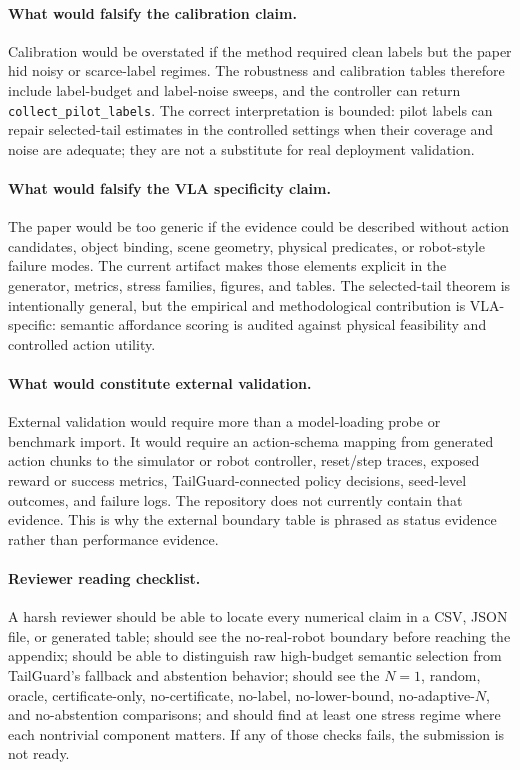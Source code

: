 \documentclass{article}
\begin{document}
\paragraph{What would falsify the calibration claim.}
Calibration would be overstated if the method required clean labels but the paper hid noisy or scarce-label regimes. The robustness and calibration tables therefore include label-budget and label-noise sweeps, and the controller can return \texttt{collect\_pilot\_labels}. The correct interpretation is bounded: pilot labels can repair selected-tail estimates in the controlled settings when their coverage and noise are adequate; they are not a substitute for real deployment validation.

\paragraph{What would falsify the VLA specificity claim.}
The paper would be too generic if the evidence could be described without action candidates, object binding, scene geometry, physical predicates, or robot-style failure modes. The current artifact makes those elements explicit in the generator, metrics, stress families, figures, and tables. The selected-tail theorem is intentionally general, but the empirical and methodological contribution is VLA-specific: semantic affordance scoring is audited against physical feasibility and controlled action utility.

\paragraph{What would constitute external validation.}
External validation would require more than a model-loading probe or benchmark import. It would require an action-schema mapping from generated action chunks to the simulator or robot controller, reset/step traces, exposed reward or success metrics, TailGuard-connected policy decisions, seed-level outcomes, and failure logs. The repository does not currently contain that evidence. This is why the external boundary table is phrased as status evidence rather than performance evidence.

\paragraph{Reviewer reading checklist.}
A harsh reviewer should be able to locate every numerical claim in a CSV, JSON file, or generated table; should see the no-real-robot boundary before reaching the appendix; should be able to distinguish raw high-budget semantic selection from TailGuard's fallback and abstention behavior; should see the $N=1$, random, oracle, certificate-only, no-certificate, no-label, no-lower-bound, no-adaptive-$N$, and no-abstention comparisons; and should find at least one stress regime where each nontrivial component matters. If any of those checks fails, the submission is not ready.
\end{document}
